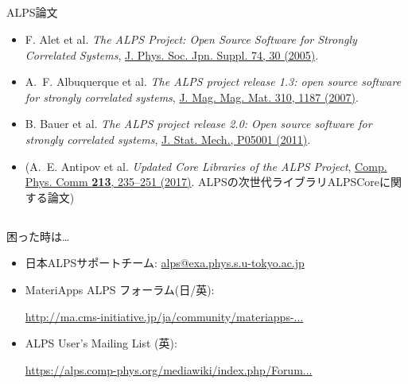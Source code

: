 \subsection*{\redb\whiteb\greenb}
\begin{frame}[t,fragile]{ALPS論文}
  \begin{itemize}
  \item F. Alet et al. {\it The ALPS Project: Open Source Software for
    Strongly Correlated Systems}, \href{http://jpsj.ipap.jp/link?JPSJS/74S/30}{J. Phys. Soc. Jpn. Suppl. 74, 30 (2005)}.
  \item A.~F. Albuquerque et al. {\it The ALPS project release 1.3: open source software for strongly correlated systems}, \href{http://dx.doi.org/10.1016/j.jmmm.2006.10.304}{J. Mag. Mag. Mat. 310, 1187 (2007)}.
  \item B. Bauer et al. {\it The ALPS project release 2.0: Open source software for strongly correlated systems}, \href{http://iopscience.iop.org/1742-5468/2011/05/P05001}{J. Stat. Mech., P05001 (2011)}.
  \item (A.~E. Antipov et al. {\it Updated Core Libraries of the ALPS Project}, \href{http://dx.doi.org/10.1016/j.cpc.2016.12.009}{Comp. Phys. Comm {\bf 213}, 235--251 (2017)}. ALPSの次世代ライブラリALPSCoreに関する論文)
  \end{itemize}
\end{frame}

\subsection*{\redb\whiteb\greenb}
\begin{frame}[t,fragile]{困った時は…}
  \begin{itemize}
    \setlength{\itemsep}{1em}
  \item 日本ALPSサポートチーム: {\href{mailto:alps@exa.phys.s.u-tokyo.ac.jp}{alps@exa.phys.s.u-tokyo.ac.jp}}
  \item MateriApps ALPS フォーラム(日/英):

    {\footnotesize \href{http://ma.cms-initiative.jp/ja/community/materiapps-messageboard/alps}{http://ma.cms-initiative.jp/ja/community/materiapps-...}}
  \item ALPS User's Mailing List (英):

    {\footnotesize \href{https://alps.comp-phys.org/mediawiki/index.php/Forum:Overview}{https://alps.comp-phys.org/mediawiki/index.php/Forum...}}
  \end{itemize}
\end{frame}

